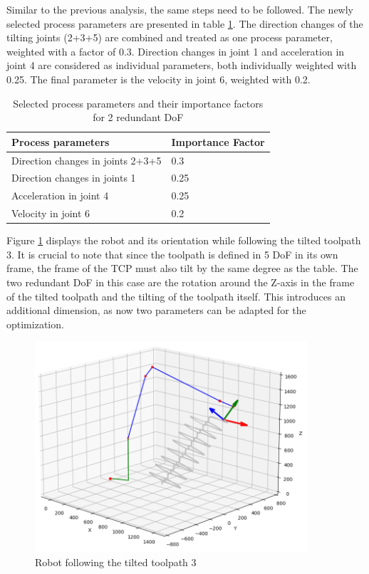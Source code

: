 Similar to the previous analysis, the same steps need to be followed. The newly selected process parameters are presented in table \ref{PP_2}. The direction changes of the tilting joints (2+3+5) are combined and treated as one process parameter, weighted with a factor of 0.3. Direction changes in joint 1 and acceleration in joint 4 are considered as individual parameters, both individually weighted with 0.25. The final parameter is the velocity in joint 6, weighted with 0.2.

\begin{table}[H]
	\centering
	\begin{tabular}{||l|l||}
		Process parameters& Importance Factor \\
		\hline
		\hline
		\hline
		Direction changes in joints 2+3+5	&		0.3 \\
		Direction changes in joints 1	&  	0.25 \\
		Acceleration in joint 4	& 		0.25\\
		Velocity in joint 6	& 		0.2\\
		\hline
		\hline
	\end{tabular}
	
	\caption{Selected process parameters and their importance factors for 2 redundant DoF}
	\label{PP_2}
\end{table}


Figure \ref{TP3_25_robot} displays the robot and its orientation while following the tilted toolpath 3. It is crucial to note that since the toolpath is defined in 5 \acrshort{DoF} in its own frame, the frame of the \acrshort{TCP} must also tilt by the same degree as the table. The two redundant \acrshort{DoF} in this case are the rotation around the Z-axis in the frame of the tilted toolpath and the tilting of the toolpath itself. This introduces an additional dimension, as now two parameters can be adapted for the optimization.


\begin{figure}[H]
	\centerline{\includegraphics[width=0.9\textwidth]{figures/robotANDpath3_45.png}}
	\caption{Robot following the tilted toolpath 3}
	\label{TP3_25_robot}
\end{figure}

